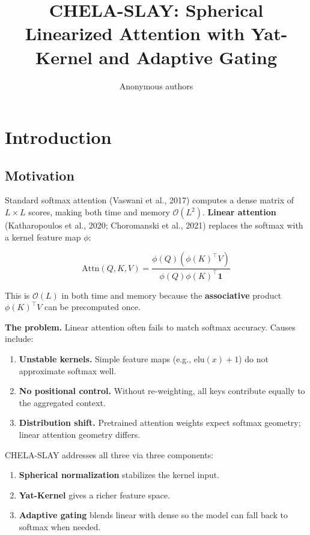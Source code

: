 \title{\textbf{CHELA-SLAY: Spherical Linearized Attention with Yat-Kernel and Adaptive Gating}}

\author{Anonymous authors}


\section{Introduction}

\subsection{Motivation}

Standard softmax attention (Vaswani et al., 2017) computes a dense matrix 
of $L \times L$ scores, making both time and memory $\mathcal{O}(L^2)$. 
\textbf{Linear attention} (Katharopoulos et al., 2020; Choromanski et al., 2021) 
replaces the softmax with a kernel feature map $\phi$:

\[
\text{Attn}(Q, K, V) = \frac{\phi(Q) (\phi(K)^\top V)}{\phi(Q) \phi(K)^\top \mathbf{1}}
\]

This is $\mathcal{O}(L)$ in both time and memory because the \textbf{associative} 
product $\phi(K)^\top V$ can be precomputed once.

\textbf{The problem.} Linear attention often fails to match softmax accuracy. 
Causes include:

\begin{enumerate}
\item \textbf{Unstable kernels.} Simple feature maps (e.g., $\text{elu}(x) + 1$) do
  not approximate softmax well.
\item \textbf{No positional control.} Without re-weighting, all keys contribute
  equally to the aggregated context.
\item \textbf{Distribution shift.} Pretrained attention weights expect softmax
  geometry; linear attention geometry differs.

\end{enumerate}
CHELA-SLAY addresses all three via three components:

\begin{enumerate}
\item \textbf{Spherical normalization} stabilizes the kernel input.
\item \textbf{Yat-Kernel} gives a richer feature space.
\item \textbf{Adaptive gating} blends linear with dense so the model can fall back
  to softmax when needed.

\end{enumerate}
